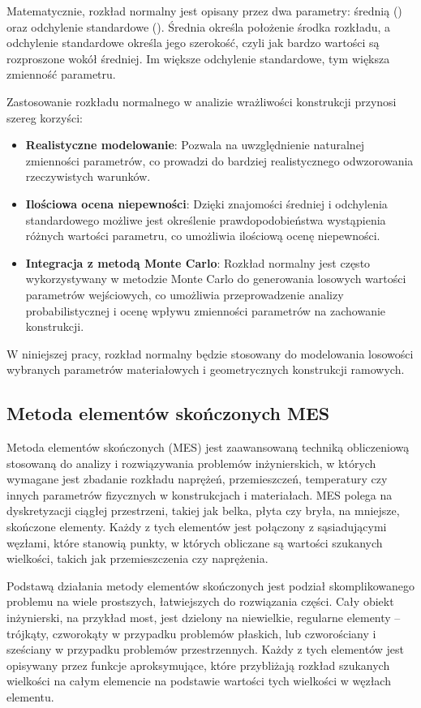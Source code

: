 Matematycznie, rozkład normalny jest opisany przez dwa parametry: średnią (\mu) oraz odchylenie standardowe (\sigma).
Średnia określa położenie środka rozkładu, a odchylenie standardowe określa jego szerokość, czyli jak bardzo wartości są rozproszone wokół średniej.
Im większe odchylenie standardowe, tym większa zmienność parametru.

Zastosowanie rozkładu normalnego w analizie wrażliwości konstrukcji przynosi szereg korzyści:

\begin{itemize}
    \item \textbf{Realistyczne modelowanie}: Pozwala na uwzględnienie naturalnej zmienności parametrów, co prowadzi do bardziej realistycznego odwzorowania rzeczywistych warunków.
    \item \textbf{Ilościowa ocena niepewności}: Dzięki znajomości średniej i odchylenia standardowego możliwe jest określenie prawdopodobieństwa wystąpienia różnych wartości parametru, co umożliwia ilościową ocenę niepewności.
    \item \textbf{Integracja z metodą Monte Carlo}: Rozkład normalny jest często wykorzystywany w metodzie Monte Carlo do generowania losowych wartości parametrów wejściowych, co umożliwia przeprowadzenie analizy probabilistycznej i ocenę wpływu zmienności parametrów na zachowanie konstrukcji.
\end{itemize}
W niniejszej pracy, rozkład normalny będzie stosowany do modelowania losowości wybranych parametrów materiałowych i geometrycznych konstrukcji ramowych.

\subsection{Metoda elementów skończonych MES}

Metoda elementów skończonych (MES) jest zaawansowaną techniką obliczeniową stosowaną do analizy i rozwiązywania problemów inżynierskich, w których wymagane jest zbadanie rozkładu naprężeń, przemieszczeń, temperatury czy innych parametrów fizycznych w konstrukcjach i materiałach.
MES polega na dyskretyzacji ciągłej przestrzeni, takiej jak belka, płyta czy bryła, na mniejsze, skończone elementy.
Każdy z tych elementów jest połączony z sąsiadującymi węzłami, które stanowią punkty, w których obliczane są wartości szukanych wielkości, takich jak przemieszczenia czy naprężenia.

Podstawą działania metody elementów skończonych jest podział skomplikowanego problemu na wiele prostszych, łatwiejszych do rozwiązania części.
Cały obiekt inżynierski, na przykład most, jest dzielony na niewielkie, regularne elementy – trójkąty, czworokąty w przypadku problemów płaskich, lub czworościany i sześciany w przypadku problemów przestrzennych.
Każdy z tych elementów jest opisywany przez funkcje aproksymujące, które przybliżają rozkład szukanych wielkości na całym elemencie na podstawie wartości tych wielkości w węzłach elementu.

